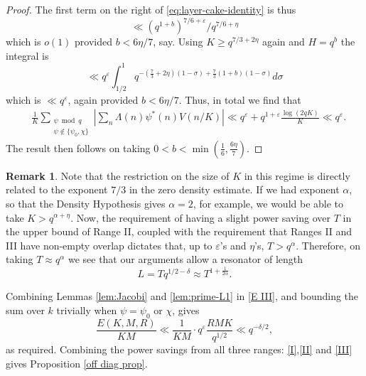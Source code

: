 \documentclass[12pt, oneside]{amsart}
\theoremstyle{definition}
\newtheorem*{rem}{Remark}
\newcommand{\geqs}{\geqslant }
\newcommand{\eps}{\varepsilon}
\newcommand{\1}{\mathds{1}}
\begin{document}
\begin{proof}
The first term on the right of \eqref{eq:layer-cake-identity} is thus 
\[
\ll (q^{1+b})^{7/6+\eps}/q^{7/6+\eta}
\]
which is $o(1)$ provided $b<6\eta/7$, say. Using $K\geqs q^{7/3+2\eta}$ again and $H=q^b$ the integral is 
\[
\ll q^{\eps}\int_{1/2}^1 q^{-(\tfrac73+2\eta)(1-\sigma)+\tfrac73(1+b)(1-\sigma)}d\sigma
\]
which is $\ll q^\eps$, again provided $b<6\eta/7$. Thus, in total we find that 
\begin{align}
 &\frac1K
 \sum_{\substack{\psi\bmod q\\\psi\notin\{\psi_0,\chi\}}}
 \left|\sum_n\Lambda(n)\psi^*(n)V(n/K)\right|
\ll
 q^{\eps}
 +q^{1+\eps }\frac{\log(2qK)}K\ll q^\eps.
 \label{eq:primitive-prime-aggregate}
\end{align}
The result then follows on taking $0<b<\min(\tfrac16,\tfrac{6\eta}{7})$.
\end{proof}

\begin{rem} Note that the restriction on the size of $K$ in this regime is directly related to the exponent $7/3$ in the zero density estimate. If we had exponent $\alpha$, so that the Density Hypothesis gives $\alpha=2$, for example, we would be able to take $K>q^{\alpha+\eta}$. Now, the requirement of having a slight power saving over $T$ in the upper bound of   Range II, coupled with the requirement that Ranges II and III  have non-empty overlap dictates that, up to $\eps$'s and $\eta$'s, $T> q^\alpha$. Therefore, on taking $T\approx q^\alpha$ we see that our arguments allow a resonator of length
\[
L= Tq^{1/2-\delta}\approx T^{1+\tfrac{1}{2\alpha}}.
\]
\end{rem}

Combining Lemmas \ref{lem:Jacobi} and \ref{lem:prime-L1} in \eqref{E III}, and bounding the sum over $k$ trivially when $\psi=\psi_0$ or $\chi$, gives
\begin{equation}\label{III}
\frac{E(K,M,R)}{KM}\ll \frac{1}{KM}\cdot q^\eps\frac{RMK}{q^{1/2}}\ll q^{-\delta/2},
\end{equation}
 as required. Combining the power savings from all three ranges: \eqref{I},\eqref{II} and \eqref{III} gives Proposition \ref{off diag prop}. 



\end{document}
